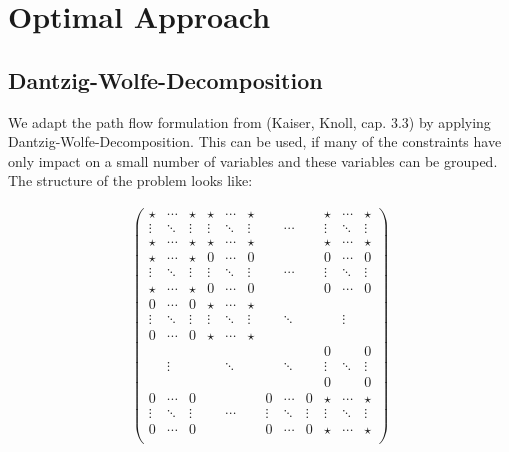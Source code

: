 \section{Optimal Approach}

\subsection{Dantzig-Wolfe-Decomposition}

We adapt the path flow formulation from (Kaiser, Knoll, cap. 3.3) by applying Dantzig-Wolfe-Decomposition. This can be used, if many of the constraints have only impact on a small number of variables and these variables can be grouped. The structure of the problem looks like:

\begin{align*}
	\left(\begin{array}{cccccccccccc}
		\star  & \cdots & \star  & \star  & \cdots & \star  &        &        &        & \star  & \cdots & \star  \\
		\vdots & \ddots & \vdots & \vdots & \ddots & \vdots &        & \cdots &        & \vdots & \ddots & \vdots \\
		\star  & \cdots & \star  & \star  & \cdots & \star  &        &        &        & \star  & \cdots & \star  \\
		\hline
		\star  & \cdots & \star  & 0      & \cdots & 0      &        &        &        & 0      & \cdots & 0      \\
		\vdots & \ddots & \vdots & \vdots & \ddots & \vdots &        & \cdots &        & \vdots & \ddots & \vdots \\
		\star  & \cdots & \star  & 0      & \cdots & 0      &        &        &        & 0      & \cdots & 0      \\
		0      & \cdots & 0      & \star  & \cdots & \star  &        &        &        &        &        &        \\
		\vdots & \ddots & \vdots & \vdots & \ddots & \vdots &        & \ddots &        &        & \vdots &        \\
		0      & \cdots & 0      & \star  & \cdots & \star  &        &        &        &        &        &        \\
		       &        &        &        &        &        &        &        &        & 0      &        & 0      \\
		       & \vdots &        &        & \ddots &        &        & \ddots &        & \vdots & \ddots & \vdots \\
		       &        &        &        &        &        &        &        &        & 0      &        & 0      \\
		0      & \cdots & 0      &        &        &        & 0      & \cdots & 0      & \star  & \cdots & \star  \\
		\vdots & \ddots & \vdots &        & \cdots &        & \vdots & \ddots & \vdots & \vdots & \ddots & \vdots \\
		0      & \cdots & 0      &        &        &        & 0      & \cdots & 0      & \star  & \cdots & \star  \\
	\end{array}\right)
\end{align*}

